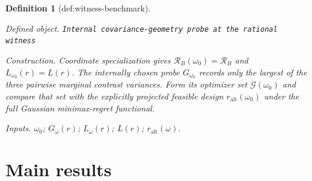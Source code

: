 \documentclass{article}
\newtheorem{definition}{Definition}
\begin{document}
\begin{definition}[def:witness-benchmark]\label{def:witness-benchmark}
\par\smallskip\noindent\emph{Defined object.} \texttt{Internal covariance-\allowbreak{}geometry probe at the rational witness}
\par\smallskip\noindent\emph{Construction.} Coordinate specialization gives \(\mathcal R_B(\omega_0)=\mathcal R_B\) and \(L_{\omega_0}(r)=L(r)\). The internally chosen probe \(G_{\omega_0}\) records only the largest of the three pairwise marginal contrast variances. Form its optimizer set \(\mathcal G(\omega_0)\) and compare that set with the explicitly projected feasible design \(r_{\mathrm{alt}}(\omega_0)\) under the full Gaussian minimax-regret functional.
\par\smallskip\noindent\emph{Inputs.} \(\omega_0\); \(G_\omega(r)\); \(L_\omega(r)\); \(L(r)\); \(r_{\mathrm{alt}}(\omega)\).
\end{definition}

\section{Main results}
\end{document}
